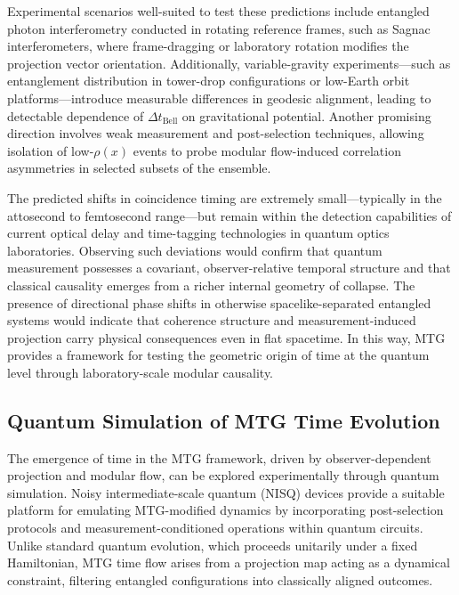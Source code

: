 \documentclass[11pt]{article}
\begin{document}
Experimental scenarios well-suited to test these predictions include entangled photon interferometry conducted in rotating reference frames, such as Sagnac interferometers, where frame-dragging or laboratory rotation modifies the projection vector orientation. Additionally, variable-gravity experiments—such as entanglement distribution in tower-drop configurations or low-Earth orbit platforms—introduce measurable differences in geodesic alignment, leading to detectable dependence of \( \Delta t_{\text{Bell}} \) on gravitational potential. Another promising direction involves weak measurement and post-selection techniques, allowing isolation of low-\( \rho(x) \) events to probe modular flow-induced correlation asymmetries in selected subsets of the ensemble.

The predicted shifts in coincidence timing are extremely small—typically in the attosecond to femtosecond range—but remain within the detection capabilities of current optical delay and time-tagging technologies in quantum optics laboratories. Observing such deviations would confirm that quantum measurement possesses a covariant, observer-relative temporal structure and that classical causality emerges from a richer internal geometry of collapse. The presence of directional phase shifts in otherwise spacelike-separated entangled systems would indicate that coherence structure and measurement-induced projection carry physical consequences even in flat spacetime. In this way, MTG provides a framework for testing the geometric origin of time at the quantum level through laboratory-scale modular causality.
\subsection{Quantum Simulation of MTG Time Evolution}

The emergence of time in the MTG framework, driven by observer-dependent projection and modular flow, can be explored experimentally through quantum simulation. Noisy intermediate-scale quantum (NISQ) devices provide a suitable platform for emulating MTG-modified dynamics by incorporating post-selection protocols and measurement-conditioned operations within quantum circuits. Unlike standard quantum evolution, which proceeds unitarily under a fixed Hamiltonian, MTG time flow arises from a projection map acting as a dynamical constraint, filtering entangled configurations into classically aligned outcomes.
\end{document}
